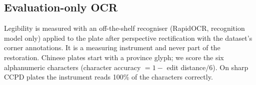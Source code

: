\subsection{Evaluation-only OCR}
Legibility is measured with an off-the-shelf recogniser (RapidOCR, recognition model only) applied
to the plate after perspective rectification with the dataset's corner annotations. It is a
measuring instrument and never part of the restoration. Chinese plates start with a province
glyph; we score the six alphanumeric characters (character accuracy $=1-$ edit distance$/6$).
On sharp CCPD plates the instrument reads 100\% of the characters correctly.
